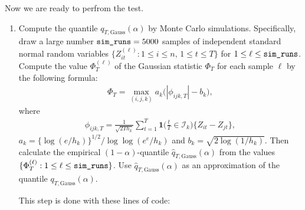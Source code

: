 \documentclass[a4paper]{scrartcl}
\begin{document}
Now we are ready to perfrom the test.
\begin{enumerate}[label=\textit{Step \arabic*.}, leftmargin=1.45cm]
  \item Compute the quantile $q_{T,\text{Gauss}}(\alpha)$ by Monte Carlo simulations. Specifically, draw a large number $\verb|sim_runs| = 5000$ samples of independent standard normal random variables $\{Z_{it}^{(\ell)} : 1 \le i \le n, \, 1 \le t \le T \}$ for $1 \le \ell \le \verb|sim_runs|$. Compute the value $\Phi_T^{(\ell)}$ of the Gaussian statistic $\Phi_T$ for each sample $\ell$ by the following formula:
\begin{align*}
\Phi_T = \max_{(i,j,k)} a_k \big( |\phi_{ijk,T}| - b_k \big),
\end{align*}
where
\begin{align*}
\phi_{ijk,T} = \frac{1}{\sqrt{2Th_k}} \sum\limits_{t=1}^T \mathbf{1}\Big(\frac{t}{T} \in \mathcal{I}_k\Big) \big\{ Z_{it} - Z_{jt} \big\},
\end{align*}
$a_k = \{\log(e/h_k)\}^{1/2} / \log \log(e^e / h_k)$ and $b_k = \sqrt{2 \log(1/h_k)}$. Then calculate the empirical $(1-\alpha)$-quantile $\hat{q}_{T,\text{Gauss}}(\alpha)$ from the values $\{ \Phi_T^{(\ell)}: 1 \le \ell \le \verb|sim_runs| \}$. Use $\hat{q}_{T,\text{Gauss}}(\alpha)$ as an approximation of the quantile $q_{T,\text{Gauss}}(\alpha)$.

This step is done with these lines of code:


\end{enumerate}
\end{document}
